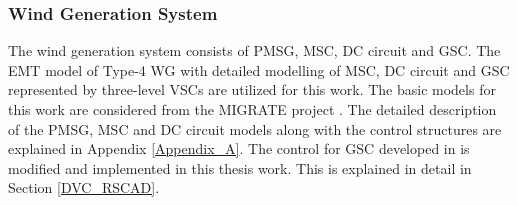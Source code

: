 \subsubsection{Wind Generation System}
The wind generation system consists of \gls{PMSG}, \gls{MSC}, \gls{DC} circuit and \gls{GSC}. The \gls{EMT} model of Type-4 \gls{WG} with detailed modelling of \gls{MSC}, \gls{DC} circuit and \gls{GSC} represented by three-level \gls{VSC}s are utilized for this work. The basic models for this work are considered from the MIGRATE project \cite{denis_migrate_2018}. The detailed description of the \gls{PMSG}, \gls{MSC} and \gls{DC} circuit models along with the control structures are explained in Appendix \ref{Appendix_A}. The control for \gls{GSC} developed in \cite{sethi_real-time_nodate-new} is modified and implemented in this thesis work. This is explained in detail in Section \ref{DVC_RSCAD}.

